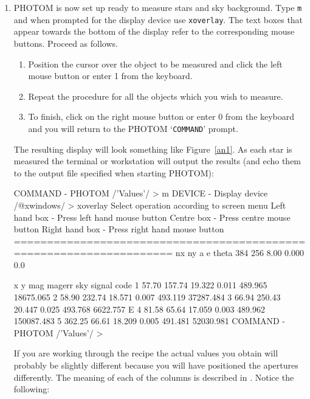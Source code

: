 \documentclass[twoside,11pt,nolof]{starlink}
\begin{document}
\begin{enumerate}
\begin{itemize}
  \end{itemize}

  \item PHOTOM is now set up ready to measure stars and sky background.
   Type \texttt{m} and when prompted for the display device use \texttt{xoverlay}.  The text boxes that appear towards the bottom of the
   display refer to the corresponding mouse buttons.  Proceed as
   follows.

  \begin{enumerate}

    \item Position the cursor over the object to be measured and
     click the left mouse button or enter 1 from the keyboard.

    \item Repeat the procedure for all the objects which you wish
     to measure.

    \item To finish, click on the right mouse button or enter 0 from
     the keyboard and you will return to the PHOTOM `\texttt{COMMAND}'
     prompt.

  \end{enumerate}

   The resulting display will look something like Figure~\ref{an1}.
   As each star is measured the terminal or workstation will output the
   results (and echo them to the output file specified when starting
   PHOTOM):

{\samepage
\begin{terminalv}
COMMAND - PHOTOM /'Values'/ > m
DEVICE - Display device /@xwindows/ > xoverlay
Select operation according to screen menu
Left hand box  - Press left hand mouse button
Centre box     - Press centre mouse button
Right hand box - Press right hand mouse button
====================================================================
         nx       ny        a        e       theta
        384      256       8.00     0.000      0.0

           x        y      mag     magerr      sky       signal code
    1    57.70   157.74   19.322    0.011    489.965  18675.065
    2    58.90   232.74   18.571    0.007    493.119  37287.484
    3    66.94   250.43   20.447    0.025    493.768   6622.757 E
    4    81.58    65.64   17.059    0.003    489.962 150087.483
    5   362.25    66.61   18.209    0.005    491.481  52030.981
COMMAND - PHOTOM /'Values'/ >
\end{terminalv}
}

   If you are working through the recipe the actual values you obtain
   will probably be slightly different because you will have positioned
   the apertures differently.  The meaning of each of the columns is
   described in . Notice the following:


\end{enumerate}
\end{document}
